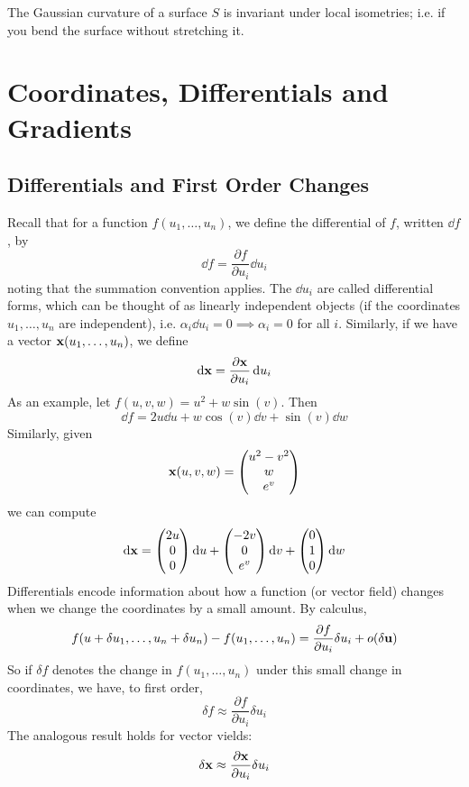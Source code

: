 \documentclass{article}
\begin{document}
\begin{theorem}
	The Gaussian curvature of a surface $S$ is invariant under local isometries; i.e. if you bend the surface without stretching it.
\end{theorem}

\section{Coordinates, Differentials and Gradients}
\subsection{Differentials and First Order Changes}
Recall that for a function $f(u_1, \dots, u_n)$, we define the differential of $f$, written $\dd{f}$, by
\[ \dd{f} = \frac{\partial f}{\partial u_i} \dd{u}_i \]
noting that the summation convention applies. The $\dd{u}_i$ are called differential forms, which can be thought of as linearly independent objects (if the coordinates $u_1, \dots, u_n$ are independent), i.e. $\alpha_i \dd{u}_i = 0 \implies \alpha_i = 0$ for all $i$. Similarly, if we have a vector $\vb x(u_1, \dots, u_n)$, we define
\[ \dd \vb x = \frac{\partial \vb x}{\partial u_i} \dd{u}_i \]
As an example, let $f(u, v, w) = u^2 + w \sin(v)$. Then
\[ \dd{f} = 2u \dd{u} + w \cos(v) \dd{v} + \sin(v) \dd{w} \]
Similarly, given
\[ \vb x(u, v, w) = \begin{pmatrix}
		u^2 - v^2 \\ w \\ e^v
	\end{pmatrix} \]
we can compute
\[ \dd \vb x = \begin{pmatrix}
		2u \\ 0 \\ 0
	\end{pmatrix} \dd{u} + \begin{pmatrix}
		-2v \\ 0 \\ e^v
	\end{pmatrix} \dd{v} + \begin{pmatrix}
		0 \\ 1 \\ 0
	\end{pmatrix} \dd{w} \]
Differentials encode information about how a function (or vector field) changes when we change the coordinates by a small amount. By calculus,
\[ f(u + \delta u_1, \dots, u_n + \delta u_n) - f(u_1, \dots, u_n) = \frac{\partial f}{\partial u_i} \delta u_i + o(\delta \vb u) \]
So if $\delta f$ denotes the change in $f(u_1, \dots, u_n)$ under this small change in coordinates, we have, to first order,
\[ \delta f \approx \frac{\partial f}{\partial u_i}\delta u_i \]
The analogous result holds for vector vields:
\[ \delta \vb x \approx \frac{\partial \vb x}{\partial u_i}\delta u_i \]
\end{document}
